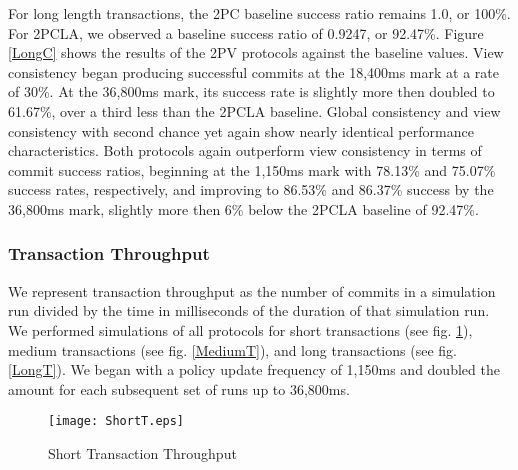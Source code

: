 \documentclass[11pt]{article}
\begin{document}
For long length transactions, the 2PC baseline success ratio remains 1.0, or 100\%. For 2PCLA, we observed a baseline success ratio of 0.9247, or 92.47\%. Figure \ref{LongC} shows the results of the 2PV protocols against the baseline values. View consistency began producing successful commits at the 18,400ms mark at a rate of 30\%. At the 36,800ms mark, its success rate is slightly more then doubled to 61.67\%, over a third less than the 2PCLA baseline. Global consistency and view consistency with second chance yet again show nearly identical performance characteristics. Both protocols again outperform view consistency in terms of commit success ratios, beginning at the 1,150ms mark with 78.13\% and 75.07\% success rates, respectively, and improving to 86.53\% and 86.37\% success by the 36,800ms mark, slightly more then 6\% below the 2PCLA baseline of 92.47\%.
\subsubsection{Transaction Throughput}
We represent transaction throughput as the number of commits in a simulation run divided by the time in milliseconds of the duration of that simulation run. We performed simulations of all protocols for short transactions (see fig. \ref{ShortT}), medium transactions (see fig. \ref{MediumT}), and long transactions (see fig. \ref{LongT}). We began with a policy update frequency of 1,150ms and doubled the amount for each subsequent set of runs up to 36,800ms.
\begin{figure}[h]
\begin{center}
\texttt{[image: ShortT.eps]}
\caption{Short Transaction Throughput}
\label{ShortT}
\end{center}
\end{figure}
\end{document}

